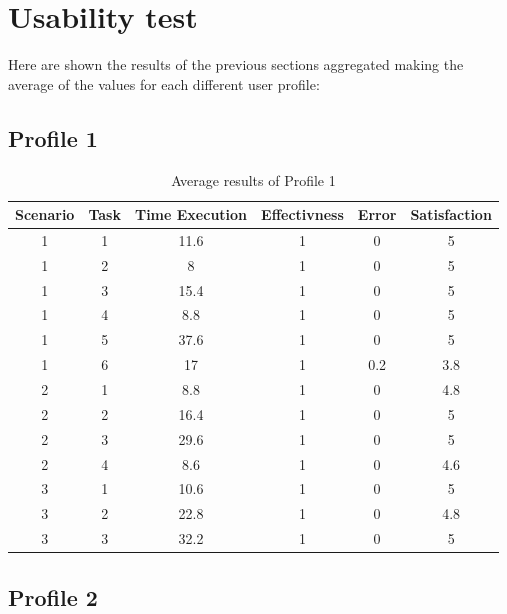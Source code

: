 \section{Usability test}
Here are shown the results of the previous sections aggregated making the average of the values for each different user profile:

\subsection{Profile 1}
\begin{table}[H]
  \begin{center}
    \begin{tabular}{||c|c|c|c|c|c||} %
      \textbf{Scenario} & \textbf{Task} & \textbf{Time Execution} & \textbf{Effectivness} & \textbf{Error} & \textbf{Satisfaction}\\
      
      \hline
        1 & 1 & 11.6 & 1 & 0 & 5\\
        1 & 2 & 8 & 1 & 0 & 5\\
        1 & 3 & 15.4 & 1 & 0 & 5\\
        1 & 4 & 8.8 & 1 & 0 & 5\\
        1 & 5 & 37.6 & 1 & 0 & 5\\
        1 & 6 & 17 & 1 & 0.2 & 3.8\\
        \hline
        2 & 1 & 8.8 & 1 & 0 & 4.8\\
        2 & 2 & 16.4 & 1 & 0 & 5\\
        2 & 3 & 29.6 & 1 & 0 & 5\\
        2 & 4 & 8.6 & 1 & 0 & 4.6\\
        \hline
        3 & 1 & 10.6 & 1 & 0 & 5\\
        3 & 2 & 22.8 & 1 & 0 & 4.8\\
        3 & 3 & 32.2 & 1 & 0 & 5\\
        \hline

    \end{tabular}
  \end{center}
  \caption{Average results of Profile 1}
\end{table}

\subsection{Profile 2}


